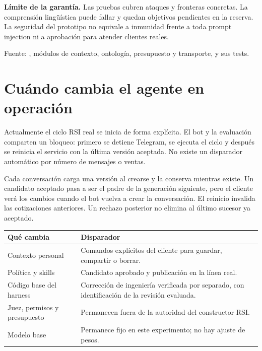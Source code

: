 \documentclass[11pt,a4paper]{article}
\newcommand{\code}[1]{\texttt{\detokenize{#1}}}
\newcommand{\source}[1]{\par{\footnotesize\color{muted}Fuente: #1.\par}}
\begin{document}
\begin{limite}
\textbf{Límite de la garantía.} Las pruebas cubren ataques y fronteras concretas.
La comprensión lingüística puede fallar y quedan objetivos pendientes en la
reserva. La seguridad del prototipo no equivale a inmunidad frente a toda
prompt injection ni a aprobación para atender clientes reales.
\end{limite}
\source{\code{docs/RSI.md}, módulos de contexto, ontología, presupuesto y transporte, y sus tests}

\newpage
\section{Cuándo cambia el agente en operación}
Actualmente el ciclo RSI real se inicia de forma explícita. El bot y la evaluación
comparten un bloqueo: primero se detiene Telegram, se ejecuta el ciclo y después
se reinicia el servicio con la última versión aceptada. No existe un disparador
automático por número de mensajes o ventas.

\begin{center}
\end{center}

Cada conversación carga una versión al crearse y la conserva mientras existe.
Un candidato aceptado pasa a ser el padre de la generación siguiente, pero el
cliente verá los cambios cuando el bot vuelva a crear la conversación. El reinicio
invalida las cotizaciones anteriores. Un rechazo posterior no elimina al último
sucesor ya aceptado.

\begin{tabularx}{\linewidth}{@{}P{46mm}Y@{}}
\toprule
\textbf{Qué cambia} & \textbf{Disparador}\\
\midrule
Contexto personal & Comandos explícitos del cliente para guardar, compartir o borrar.\\
Política y skills & Candidato aprobado y publicación en la línea real.\\
Código base del harness & Corrección de ingeniería verificada por separado, con identificación de la revisión evaluada.\\
Juez, permisos y presupuesto & Permanecen fuera de la autoridad del constructor RSI.\\
Modelo base & Permanece fijo en este experimento; no hay ajuste de pesos.\\
\bottomrule
\end{tabularx}
\end{document}
